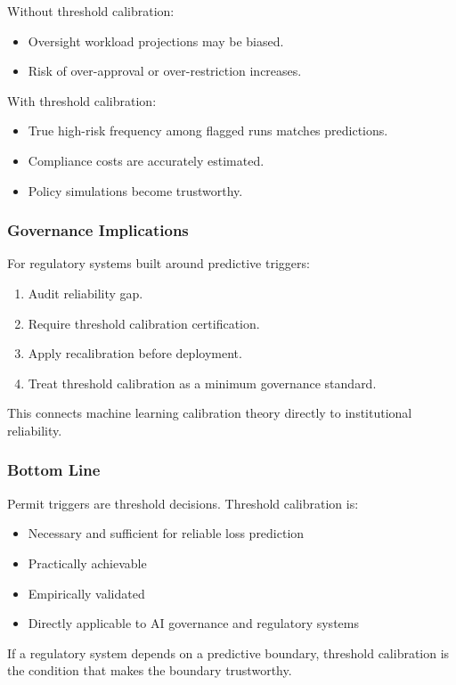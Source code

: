 Without threshold calibration:
\begin{itemize}
    \item Oversight workload projections may be biased.
    \item Risk of over-approval or over-restriction increases.
\end{itemize}

With threshold calibration:
\begin{itemize}
    \item True high-risk frequency among flagged runs matches predictions.
    \item Compliance costs are accurately estimated.
    \item Policy simulations become trustworthy.
\end{itemize}

\subsubsection{Governance Implications}
For regulatory systems built around predictive triggers:

\begin{enumerate}
    \item Audit reliability gap.
    \item  Require threshold calibration certification.
    \item  Apply recalibration before deployment.
    \item Treat threshold calibration as a minimum governance standard.
\end{enumerate}

This connects machine learning calibration theory directly to institutional reliability.

\subsubsection{Bottom Line}
Permit triggers are threshold decisions. Threshold calibration is:
\begin{itemize}
    \item Necessary and sufficient for reliable loss prediction
    \item Practically achievable
    \item Empirically validated
    \item Directly applicable to AI governance and regulatory systems
\end{itemize}

If a regulatory system depends on a predictive boundary, threshold calibration is the condition that makes the boundary trustworthy.
